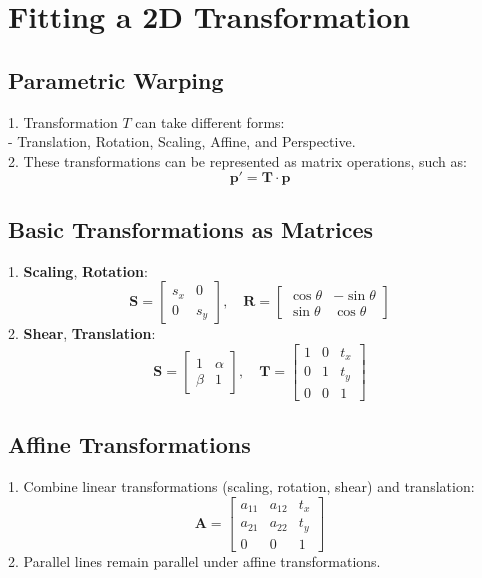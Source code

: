 \section{Fitting a 2D Transformation}

\subsection*{Parametric Warping}
1. Transformation \(T\) can take different forms: \\
   - Translation, Rotation, Scaling, Affine, and Perspective. \\
2. These transformations can be represented as matrix operations, such as:
   \[
   \mathbf{p'} = \mathbf{T} \cdot \mathbf{p}
   \]

\subsection*{Basic Transformations as Matrices}
1. \textbf{Scaling}, \quad \textbf{Rotation}: \\
   \[
   \mathbf{S} = 
   \begin{bmatrix}
   s_x & 0 \\
   0 & s_y
   \end{bmatrix}, \quad
   \mathbf{R} =
   \begin{bmatrix}
   \cos \theta & -\sin \theta \\
   \sin \theta & \cos \theta
   \end{bmatrix}
   \] 
2. \textbf{Shear}, \quad \textbf{Translation}: \\
   \[
   \mathbf{S} = 
   \begin{bmatrix}
   1 & \alpha \\
   \beta & 1
   \end{bmatrix}, \quad
   \mathbf{T} =
   \begin{bmatrix}
   1 & 0 & t_x \\
   0 & 1 & t_y \\
   0 & 0 & 1
   \end{bmatrix}
   \]

\subsection*{Affine Transformations}
1. Combine linear transformations (scaling, rotation, shear) and translation:
   \[
   \mathbf{A} =
   \begin{bmatrix}
   a_{11} & a_{12} & t_x \\
   a_{21} & a_{22} & t_y \\
   0 & 0 & 1
   \end{bmatrix}
   \]
2. Parallel lines remain parallel under affine transformations.

